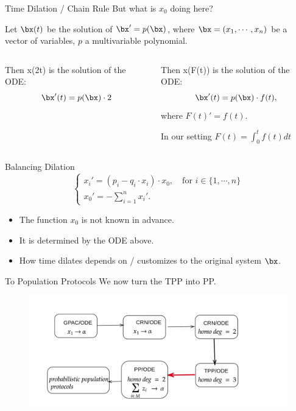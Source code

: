 \documentclass[aspectratio=169]{beamer}
\begin{document}
\begin{frame}[Clean]{Time Dilation / Chain Rule}
But what is $x_0$ doing here?

Let $\bx(t)$ be the solution of $\bx' = p(\bx)$, where $\bx=(x_1, \cdots, x_n)$ be a vector of variables, $p$ a multivariable polynomial.
\begin{columns}
\begin{column}{0.5\textwidth}
   \begin{example}
 Then x(2t) is the solution of the ODE:
    \[
        \bx'(t) = p(\bx) \cdot 2
    \]
\end{example}
\end{column}
\begin{column}{0.5\textwidth}  %
\begin{example}
  Then x(F(t)) is the solution of the ODE:
  \[
        \bx'(t) = p(\bx) \cdot f(t),
  \]
  where $F(t)' = f(t)$.

  In our setting $F(t) =\int_{0}^{t} f(t) dt$
\end{example}
\end{column}
\end{columns}
\end{frame}

\begin{frame}{Balancing Dilation}
\[
\begin{cases}
  x_i' = (p_i - q_i \cdot x_i)\cdot x_0,  \quad \text{for $i\in\{1, \cdots, n\}$}\\
  x_0' = -\sum_{i=1}^{n} x_i'.
\end{cases}
\]
\begin{itemize}
    \item The function $x_0$ is not known in advance.
    \item It is determined by the ODE above.
    \item How time dilates depends on / customizes to the original system $\bx$.
\end{itemize}
\end{frame}

\begin{frame}[Clean]{To Population Protocols}
    We now turn the TPP into PP.
    \begin{figure}[tb]
        \centering
        \includegraphics[scale=0.25]{flow3}
    \end{figure}
\end{frame}
\end{document}
